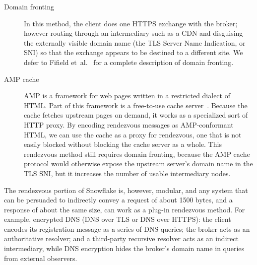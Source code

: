 \documentclass[letterpaper,twocolumn]{article}
\begin{document}
\begin{description}
\item[Domain fronting]
In this method, the client does one HTTPS exchange
with the broker; however routing through an intermediary such as a CDN
and disguising the externally visible domain name
(the TLS Server Name Indication, or SNI) so that the exchange
appears to be destined to a different site.
We defer to Fifield et~al.~\cite{Fifield2015a}
for a complete description of domain fronting.
\item[AMP cache]
AMP is a framework for web pages written in a restricted dialect of HTML.
Part of this framework is a free-to-use
cache server~\cite{amp-cache}.
Because the cache fetches upstream pages on demand,
it works as a specialized sort of HTTP proxy.
By encoding rendezvous messages as AMP-conformant HTML,
we can use the cache as a proxy for rendezvous,
one that is not easily blocked without blocking the cache server as a whole.
This rendezvous method still requires domain fronting,
because the AMP cache protocol would otherwise expose the
upstream server's domain name in the TLS SNI,
but it increases the number of usable intermediary nodes.
\end{description}

The rendezvous portion of Snowflake is, however, modular,
and any system that can be persuaded to indirectly convey a request
of about 1500 bytes, and a response of about the same size,
can work as a plug-in rendezvous method.
For example, encrypted DNS
(DNS over TLS or DNS over HTTPS):
the client encodes its registration message as a series of DNS queries;
the broker acts as an authoritative resolver;
and a third-party recursive resolver acts as an indirect intermediary,
while DNS encryption hides the broker's domain name in queries
from external observers.
\end{document}
